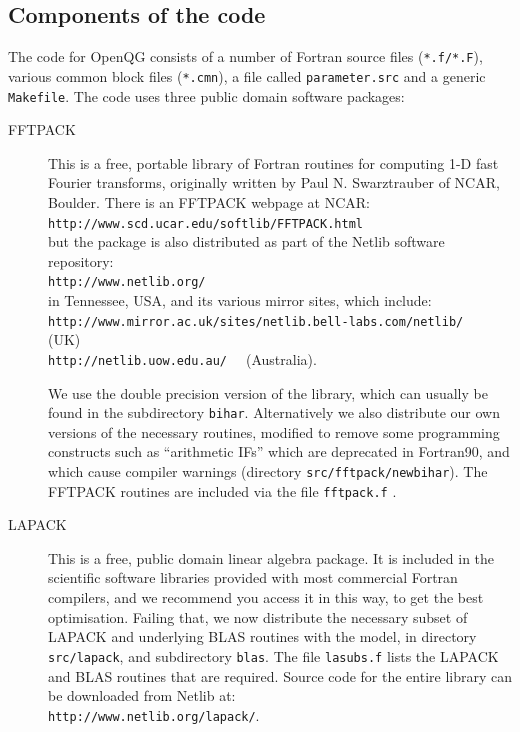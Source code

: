\documentclass[11pt, a4paper,twoside]{article}
\numberwithin{equation}{section}
\begin{document}
\subsection{Components of the code}
The code for OpenQG consists of a number of Fortran source files (\verb=*.f/*.F=), various common block files (\verb=*.cmn=), a file called \verb=parameter.src= and a generic \verb=Makefile=.
The code uses three public domain software packages:
\begin{description}
\item[FFTPACK] This is a free, portable library of Fortran routines for computing 1-D fast Fourier transforms, originally written by Paul N. Swarztrauber of NCAR, Boulder. There is an FFTPACK webpage at NCAR:\\ \verb=http://www.scd.ucar.edu/softlib/FFTPACK.html=\\
 but the package is also distributed as part of the Netlib software repository: \\
\verb=http://www.netlib.org/=\\
 in Tennessee, USA, and its various mirror sites, which include:\\ \verb=http://www.mirror.ac.uk/sites/netlib.bell-labs.com/netlib/  =   (UK)  \\
\verb=http://netlib.uow.edu.au/  =                            (Australia).

We use the double precision version of the library, which can usually be found in the subdirectory \verb=bihar=.
Alternatively we also distribute our own versions of the necessary routines, modified to remove some programming constructs such as ``arithmetic IFs'' which are deprecated in Fortran90, and which cause compiler warnings (directory \verb=src/fftpack/newbihar=).
The FFTPACK routines are included via the file \verb=fftpack.f= .

\item[LAPACK] This is a free, public domain linear algebra package.
It is included in the scientific software libraries provided with most commercial Fortran compilers, and we recommend you access it in this way, to get the best optimisation.
Failing that, we now distribute the necessary subset of LAPACK and underlying BLAS routines with the model, in directory \verb=src/lapack=, and subdirectory \verb=blas=.
The file \verb=lasubs.f= lists the LAPACK and BLAS routines that are required.
Source code for the entire library can be downloaded from Netlib at:\\
\verb=http://www.netlib.org/lapack/=.\\


\end{description}
\end{document}
